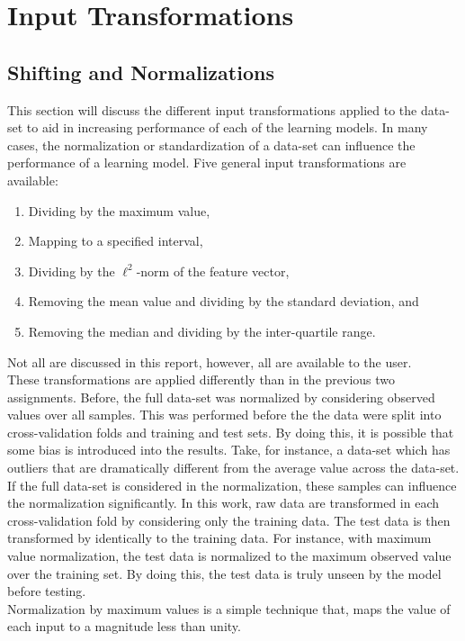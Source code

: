 \documentclass[paper=a4, fontsize=11pt]{scrartcl} %
\begin{document}
\section{Input Transformations} \label{sec: input scaling}
\subsection*{Shifting and Normalizations}
This section will discuss the different input transformations applied to the data-set to aid in increasing performance of each of the learning models.
In many cases, the normalization or standardization of a data-set can influence the performance of a learning model.
Five general input transformations are available: 
\begin{enumerate}
	\item Dividing by the maximum value, 
	\item Mapping to a specified interval, 
	\item Dividing by the $\ell^2$-norm of the feature vector, 
	\item Removing the mean value and dividing by the standard deviation, and 
	\item Removing the median and dividing by the inter-quartile range.
\end{enumerate}
Not all are discussed in this report, however, all are available to the user.
\\
These transformations are applied differently than in the previous two assignments.
Before, the full data-set was normalized by considering observed values over all samples.
This was performed before the the data were split into cross-validation folds and training and test sets.
By doing this, it is possible that some bias is introduced into the results.
Take, for instance, a data-set which has outliers that are dramatically different from the average value across the data-set.
If the full data-set is considered in the normalization, these samples can influence the normalization significantly.
In this work, raw data are transformed in each cross-validation fold by considering only the training data.
The test data is then transformed by identically to the training data.
For instance, with maximum value normalization, the test data is normalized to the maximum observed value over the training set.
By doing this, the test data is truly unseen by the model before testing.
\\
Normalization by maximum values is a simple technique that, maps the value of each input to a magnitude less than unity.
\end{document}
